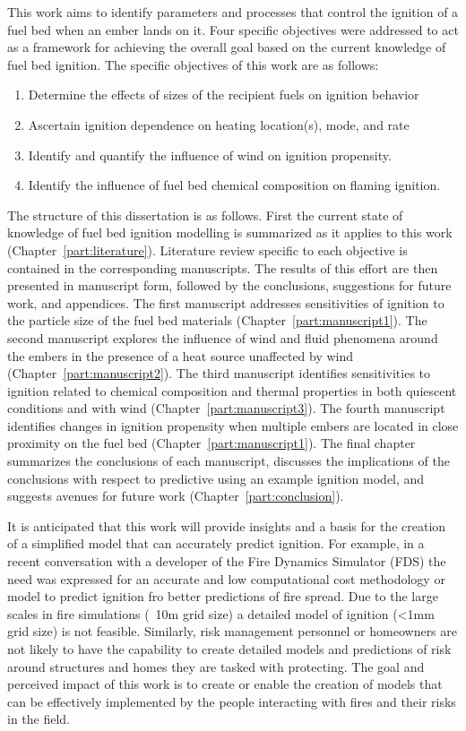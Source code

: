     This work aims to identify parameters and processes that control the ignition of a fuel bed when an ember lands on it. Four specific objectives were addressed to act as a framework for achieving the overall goal based on the current knowledge of fuel bed ignition. The specific objectives of this work are as follows:
        \begin{enumerate}
            \item Determine the effects of sizes of the recipient fuels on ignition behavior
            \item Ascertain ignition dependence on heating location(s), mode, and rate
            \item Identify and quantify the influence of wind on ignition propensity.
            \item Identify the influence of fuel bed chemical composition on flaming ignition.
        \end{enumerate}
    The structure of this dissertation is as follows. First the current state of knowledge of fuel bed ignition modelling is summarized as it applies to this work (Chapter~\ref{part:literature}). Literature review specific to each objective is contained in the corresponding manuscripts. The results of this effort are then presented in manuscript form, followed by the conclusions, suggestions for future work, and appendices. The first manuscript addresses sensitivities of ignition to the particle size of the fuel bed materials (Chapter~\ref{part:manuscript1}). The second manuscript explores the influence of wind and fluid phenomena around the embers in the presence of a heat source unaffected by wind (Chapter~\ref{part:manuscript2}). The third manuscript identifies sensitivities to ignition related to chemical composition and thermal properties in both quiescent conditions and with wind (Chapter~\ref{part:manuscript3}). The fourth manuscript identifies changes in ignition propensity when multiple embers are located in close proximity on the fuel bed (Chapter~\ref{part:manuscript1}). The final chapter summarizes the conclusions of each manuscript, discusses the implications of the conclusions with respect to predictive using an example ignition model, and suggests avenues for future work (Chapter~\ref{part:conclusion}). 
    
    It is anticipated that this work will provide insights and a basis for the creation of a simplified model that can accurately predict ignition. For example, in a recent conversation with a developer of the Fire Dynamics Simulator (FDS) the need was expressed for an accurate and low computational cost methodology or model to predict ignition fro better predictions of fire spread. Due to the large scales in fire simulations (~10\si{\meter} grid size) a detailed model of ignition (<1\si{\milli\meter} grid size) is not feasible. Similarly, risk management personnel or homeowners are not likely to have the capability to create detailed models and predictions of risk around structures and homes they are tasked with protecting. The goal and perceived impact of this work is to create or enable the creation of models that can be effectively implemented by the people interacting with fires and their risks in the field. 